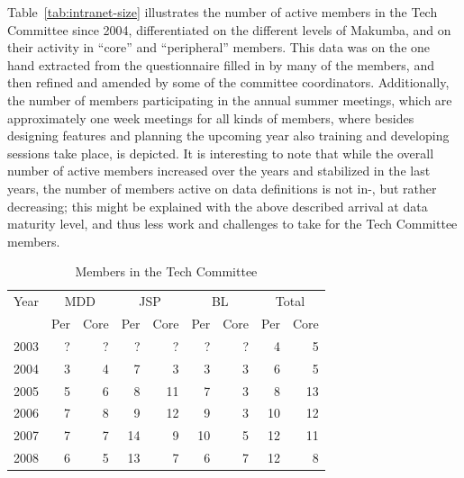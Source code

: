 \documentclass{acm_proc_article-sp}
\begin{document}
Table~\ref{tab:intranet-size} illustrates the number of active members in the Tech Committee since 2004, differentiated on the different levels of Makumba, and on their activity in ``core'' and ``peripheral'' members. This data was on the one hand extracted from the questionnaire filled in by many of the members, and then refined and amended by some of the committee coordinators. Additionally, the number of members participating in the annual summer meetings, which are approximately one week meetings for all kinds of members, where besides designing features and planning the upcoming year also training and developing sessions take place, is depicted. It is interesting to note that while the overall number of active members increased over the years and stabilized in the last years, the number of members active on data definitions is not in-, but rather decreasing; this might be explained with the above described arrival at data maturity level, and thus less work and challenges to take for the Tech Committee members.

\begin{table}
	\centering
	\caption{Members in the Tech Committee}
	\label{tab:itd-members}
	\begin{tabular}{c|r|r|r|r|r|r|r|r|}
		\hline
		\hline
		Year 		& \multicolumn{2}{c|}{MDD} & \multicolumn{2}{c|}{JSP}	& \multicolumn{2}{c|}{BL}	& \multicolumn{2}{c|}{Total}	\\
					& Per & Core				& Per & Core				& Per & Core				& Per & Core	\\
		\hline
		\hline
		2003 & ? & ? & ? & ? & ? & ? & 4 & 5 \\
		\hline
		2004 & 3 & 4 & 7 & 3 & 3 & 3 & 6 & 5 \\
		\hline
		2005 & 5 & 6 & 8 & 11 & 7 & 3 & 8 & 13 \\
		\hline
		2006 & 7 & 8 & 9 & 12 & 9 & 3 & 10 & 12 \\
		\hline
		2007 & 7 & 7 & 14 & 9 & 10 & 5 & 12 & 11 \\
		\hline
		2008 & 6 & 5 & 13 & 7 & 6 & 7 & 12 & 8 \\
		\hline
		\hline
	\end{tabular}
\end{table} 
\end{document}
